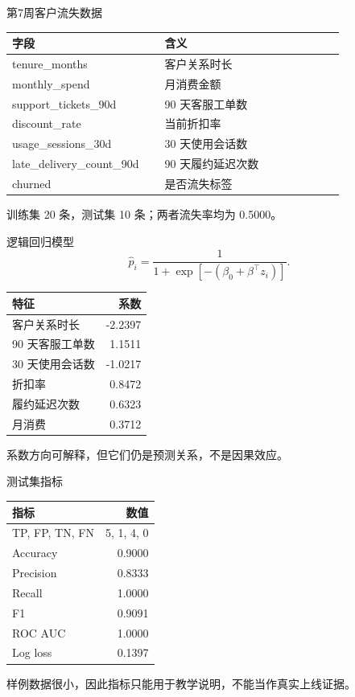 \documentclass[UTF8,fontset=fandol,aspectratio=169,11pt]{ctexbeamer}
\begin{document}
\begin{frame}{第7周客户流失数据}
\begin{center}
\begin{tabular}{p{0.34\linewidth}p{0.48\linewidth}}
\toprule
字段 & 含义\\
\midrule
tenure\_months & 客户关系时长\\
monthly\_spend & 月消费金额\\
support\_tickets\_90d & 90 天客服工单数\\
discount\_rate & 当前折扣率\\
usage\_sessions\_30d & 30 天使用会话数\\
late\_delivery\_count\_90d & 90 天履约延迟次数\\
churned & 是否流失标签\\
\bottomrule
\end{tabular}
\end{center}
\small
训练集 20 条，测试集 10 条；两者流失率均为 0.5000。
\end{frame}

\begin{frame}{逻辑回归模型}
\[
  \hat p_i=
  \frac{1}{1+\exp[-(\beta_0+\beta^\top z_i)]}.
\]
\begin{center}
\begin{tabular}{lr}
\toprule
特征 & 系数\\
\midrule
客户关系时长 & -2.2397\\
90 天客服工单数 & 1.1511\\
30 天使用会话数 & -1.0217\\
折扣率 & 0.8472\\
履约延迟次数 & 0.6323\\
月消费 & 0.3712\\
\bottomrule
\end{tabular}
\end{center}
\small
系数方向可解释，但它们仍是预测关系，不是因果效应。
\end{frame}

\begin{frame}{测试集指标}
\begin{center}
\begin{tabular}{lr}
\toprule
指标 & 数值\\
\midrule
TP, FP, TN, FN & 5, 1, 4, 0\\
Accuracy & 0.9000\\
Precision & 0.8333\\
Recall & 1.0000\\
F1 & 0.9091\\
ROC AUC & 1.0000\\
Log loss & 0.1397\\
\bottomrule
\end{tabular}
\end{center}
\vspace{0.2cm}
\small
样例数据很小，因此指标只能用于教学说明，不能当作真实上线证据。
\end{frame}
\end{document}
